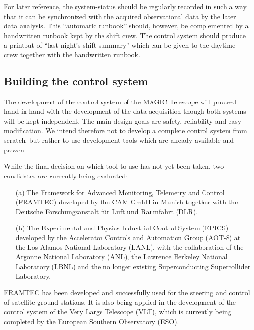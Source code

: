 For later reference, the system-status should be regularly recorded in such a
way that it can be synchronized with the acquired observational data by the
later data analysis. This ``automatic runbook'' should, however, be
complemented by a handwritten runbook kept by the shift crew. The control
system should produce a printout of ``last night's shift summary'' which can
be given to the daytime crew together with the handwritten runbook.

\subsection{Building the control system}


\medskip The development of the control system of the MAGIC Telescope will
proceed hand in hand with the development of the data acquisition though
both systems will be kept independent. The main design goals are safety,
reliability and easy modification. We intend therefore not to develop a
complete control system from scratch, but rather to use development tools
which are already available and proven.

While the final decision on which tool to use has not yet been taken, two
candidates are currently being evaluated:

\begin{itemize}
\item[(a)]  The Framework for Advanced Monitoring, Telemetry and Control
(FRAMTEC) developed by the CAM GmbH in Munich together with the Deutsche
For\-schungs\-an\-stalt f\"ur Luft und Raumfahrt (DLR).

\item[(b)]  The Experimental and Physics Industrial Control System (EPICS)
developed by the Accelerator Controls and Automation Group (AOT-8) at the
Los Alamos National Laboratory (LANL), with the collaboration of the Argonne
National Laboratory (ANL), the Lawrence Berkeley National Laboratory (LBNL)
and the no longer existing Superconducting Supercollider Laboratory.
\end{itemize}

FRAMTEC has been developed and successfully used for the steering and
control of satellite ground stations. It is also being applied in the
development of the control system of the Very Large Telescope (VLT), which
is currently being completed by the European Southern Observatory (ESO).

